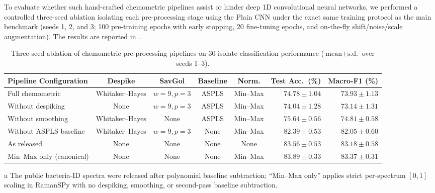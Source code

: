 \documentclass[journal,onecolumn]{IEEEtran}
\begin{document}
To evaluate whether such hand-crafted chemometric pipelines assist or hinder
deep 1D convolutional neural networks, we performed a controlled three-seed ablation
isolating each pre-processing stage using the Plain CNN under the exact same
training protocol as the main benchmark (seeds 1, 2, and 3; 100 pre-training epochs
with early stopping, 20 fine-tuning epochs, and on-the-fly shift/noise/scale
augmentation). The results are reported in .

\begin{table}[!t]
  \centering
  \caption{Three-seed ablation of chemometric pre-processing pipelines on 30-isolate classification performance ($\text{mean} \pm \text{s.d.}$ over seeds 1--3).}
  \label{tab:ablation-preproc}
  \begin{threeparttable}
  \begin{tabular}{@{}lccccrr@{}}
    \toprule
    Pipeline Configuration & Despike & SavGol & Baseline & Norm. & Test Acc.\ (\%) & Macro-F1 (\%) \\
    \midrule
    Full chemometric       & Whitaker--Hayes & $w{=}9, p{=}3$ & ASPLS & Min--Max & $74.78 \pm 1.04$ & $73.93 \pm 1.13$ \\
    Without despiking      & None            & $w{=}9, p{=}3$ & ASPLS & Min--Max & $74.04 \pm 1.28$ & $73.14 \pm 1.31$ \\
    Without smoothing      & Whitaker--Hayes & None           & ASPLS & Min--Max & $75.64 \pm 0.56$ & $74.81 \pm 0.58$ \\
    Without ASPLS baseline & Whitaker--Hayes & $w{=}9, p{=}3$ & None  & Min--Max & $82.39 \pm 0.53$ & $82.05 \pm 0.60$ \\
    As released\tnote{a}   & None            & None           & None  & None     & $83.56 \pm 0.53$ & $83.18 \pm 0.58$ \\
    Min--Max only (canonical)\tnote{a} & None & None          & None  & Min--Max & $\mathbf{83.89 \pm 0.33}$ & $\mathbf{83.37 \pm 0.31}$ \\
    \bottomrule
  \end{tabular}
  \begin{tablenotes}\footnotesize
    \item[a] The public bacteria-ID spectra \cite{ho2019rapid} were released after polynomial baseline subtraction; ``Min--Max only'' applies strict per-spectrum $[0,1]$ scaling in RamanSPy \cite{georgiev2024ramanspy} with no despiking, smoothing, or second-pass baseline subtraction.
  \end{tablenotes}
  \end{threeparttable}
\end{table}
\end{document}

